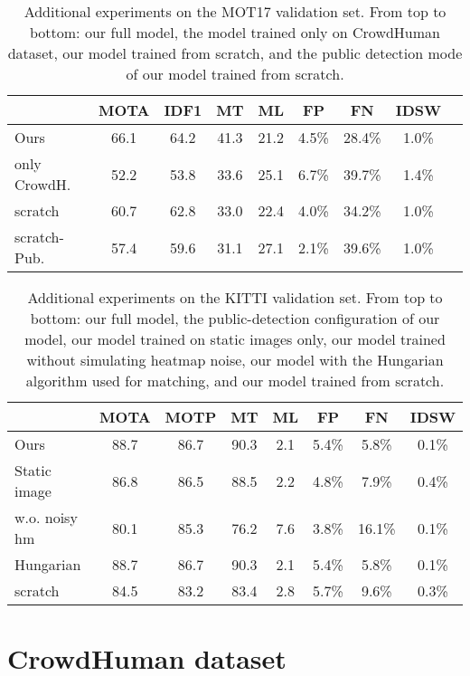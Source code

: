 \documentclass[runningheads]{llncs}
\newcommand{\lbltab}[1]{\label{tbl:#1}}
\begin{document}
\begin{table}[b]
\center 
\begin{tabular}{@{}l@{}c@{\ } c@{\ } c@{\ } c@{\ } c@{\ } c@{\ } c@{\ } c@{}}
\toprule
 & MOTA  & IDF1  & MT  & ML  & FP  & FN  & IDSW  \\
\midrule
Ours & 66.1 & 64.2 & 41.3 & 21.2 & 4.5\% & 28.4\% & 1.0\% \\
only CrowdH. & 52.2 & 53.8 & 33.6 & 25.1 & 6.7\% & 39.7\% & 1.4\% \\
scratch & 60.7 & 62.8 & 33.0  & 22.4 & 4.0\% & 34.2\% & 1.0\% \\
scratch-Pub. & 57.4 & 59.6 & 31.1 & 27.1 & 2.1\% & 39.6\% & 1.0\% \\
\bottomrule
\end{tabular}
\caption{Additional experiments on the MOT17 validation set. From top to bottom: our full model, the model trained only on CrowdHuman dataset, our model trained from scratch, and the public detection mode of our model trained from scratch.}
\lbltab{mot}
\vspace{-5mm}
\end{table}

\begin{table}
\center 
\begin{tabular}{@{}l@{}c@{\ } c@{\ } c@{\ } c@{\ } c@{\ } c@{\ } c@{}}
\toprule
 & MOTA  & MOTP  & MT  & ML  & FP  & FN  & IDSW  \\
\midrule
Ours & 88.7 & 86.7 & 90.3 & 2.1 & 5.4\% & 5.8\% & 0.1\% \\
Static image & 86.8 & 86.5 & 88.5 & 2.2 & 4.8\% & 7.9\% & 0.4\% \\
w.o. noisy hm & 80.1 & 85.3 & 76.2 & 7.6 & 3.8\% & 16.1\% & 0.1\% \\
Hungarian & 88.7 & 86.7 & 90.3 & 2.1 & 5.4\% & 5.8\% & 0.1\% \\
scratch & 84.5 & 83.2 & 83.4 & 2.8 & 5.7\% & 9.6\% & 0.3\% \\
\bottomrule
\end{tabular}
\caption{Additional experiments on the KITTI validation set. From top to bottom: our full model, the public-detection configuration of our model, our model trained on static images only, our model trained without simulating heatmap noise, our model with the Hungarian algorithm used for matching, and our model trained from scratch.}
\vspace{-5mm}
\lbltab{kitti}
\end{table}

\section{CrowdHuman dataset}
\end{document}

